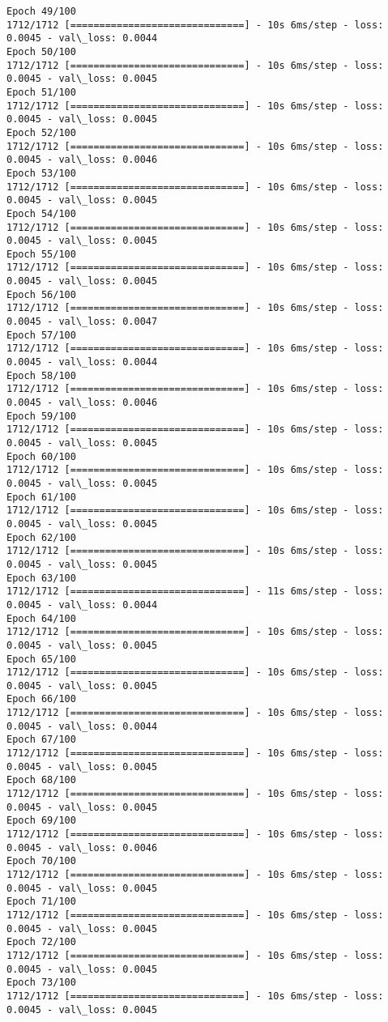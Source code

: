 \documentclass[11pt]{article}
\begin{document}
\begin{Verbatim}[commandchars=\\\{\}]
Epoch 49/100
1712/1712 [==============================] - 10s 6ms/step - loss: 0.0045 - val\_loss: 0.0044
Epoch 50/100
1712/1712 [==============================] - 10s 6ms/step - loss: 0.0045 - val\_loss: 0.0045
Epoch 51/100
1712/1712 [==============================] - 10s 6ms/step - loss: 0.0045 - val\_loss: 0.0045
Epoch 52/100
1712/1712 [==============================] - 10s 6ms/step - loss: 0.0045 - val\_loss: 0.0046
Epoch 53/100
1712/1712 [==============================] - 10s 6ms/step - loss: 0.0045 - val\_loss: 0.0045
Epoch 54/100
1712/1712 [==============================] - 10s 6ms/step - loss: 0.0045 - val\_loss: 0.0045
Epoch 55/100
1712/1712 [==============================] - 10s 6ms/step - loss: 0.0045 - val\_loss: 0.0045
Epoch 56/100
1712/1712 [==============================] - 10s 6ms/step - loss: 0.0045 - val\_loss: 0.0047
Epoch 57/100
1712/1712 [==============================] - 10s 6ms/step - loss: 0.0045 - val\_loss: 0.0044
Epoch 58/100
1712/1712 [==============================] - 10s 6ms/step - loss: 0.0045 - val\_loss: 0.0046
Epoch 59/100
1712/1712 [==============================] - 10s 6ms/step - loss: 0.0045 - val\_loss: 0.0045
Epoch 60/100
1712/1712 [==============================] - 10s 6ms/step - loss: 0.0045 - val\_loss: 0.0045
Epoch 61/100
1712/1712 [==============================] - 10s 6ms/step - loss: 0.0045 - val\_loss: 0.0045
Epoch 62/100
1712/1712 [==============================] - 10s 6ms/step - loss: 0.0045 - val\_loss: 0.0045
Epoch 63/100
1712/1712 [==============================] - 11s 6ms/step - loss: 0.0045 - val\_loss: 0.0044
Epoch 64/100
1712/1712 [==============================] - 10s 6ms/step - loss: 0.0045 - val\_loss: 0.0045
Epoch 65/100
1712/1712 [==============================] - 10s 6ms/step - loss: 0.0045 - val\_loss: 0.0045
Epoch 66/100
1712/1712 [==============================] - 10s 6ms/step - loss: 0.0045 - val\_loss: 0.0044
Epoch 67/100
1712/1712 [==============================] - 10s 6ms/step - loss: 0.0045 - val\_loss: 0.0045
Epoch 68/100
1712/1712 [==============================] - 10s 6ms/step - loss: 0.0045 - val\_loss: 0.0045
Epoch 69/100
1712/1712 [==============================] - 10s 6ms/step - loss: 0.0045 - val\_loss: 0.0046
Epoch 70/100
1712/1712 [==============================] - 10s 6ms/step - loss: 0.0045 - val\_loss: 0.0045
Epoch 71/100
1712/1712 [==============================] - 10s 6ms/step - loss: 0.0045 - val\_loss: 0.0045
Epoch 72/100
1712/1712 [==============================] - 10s 6ms/step - loss: 0.0045 - val\_loss: 0.0045
Epoch 73/100
1712/1712 [==============================] - 10s 6ms/step - loss: 0.0045 - val\_loss: 0.0045

\end{Verbatim}
\end{document}
